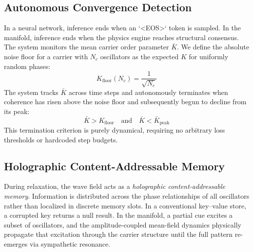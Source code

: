 \documentclass[11pt,a4paper]{article}
\begin{document}
\subsection{Autonomous Convergence Detection}
\label{subsec:convergence}

In a neural network, inference ends when an `<EOS>` token is sampled. In the manifold, inference ends when the physics engine reaches structural consensus. The system monitors the mean carrier order parameter $\bar{K}$. We define the absolute noise floor for a carrier with $N_c$ oscillators as the expected $K$ for uniformly random phases:
\begin{equation}
K_{\text{floor}}(N_c) = \frac{1}{\sqrt{N_c}}
\label{eq:noise_floor}
\end{equation}
The system tracks $\bar{K}$ across time steps and autonomously terminates when coherence has risen above the noise floor and subsequently begun to decline from its peak:
\begin{equation}
\bar{K} > K_{\text{floor}} \quad\text{and}\quad \bar{K} < \bar{K}_{\text{peak}}
\label{eq:convergence}
\end{equation}
This termination criterion is purely dynamical, requiring no arbitrary loss thresholds or hardcoded step budgets.

\subsection{Holographic Content-Addressable Memory}
\label{subsec:holographic}

During relaxation, the wave field acts as a \emph{holographic content-addressable memory}. Information is distributed across the phase relationships of all oscillators rather than localized in discrete memory slots. In a conventional key--value store, a corrupted key returns a null result. In the manifold, a partial cue excites a subset of oscillators, and the amplitude-coupled mean-field dynamics physically propagate that excitation through the carrier structure until the full pattern re-emerges via sympathetic resonance. 
\end{document}
